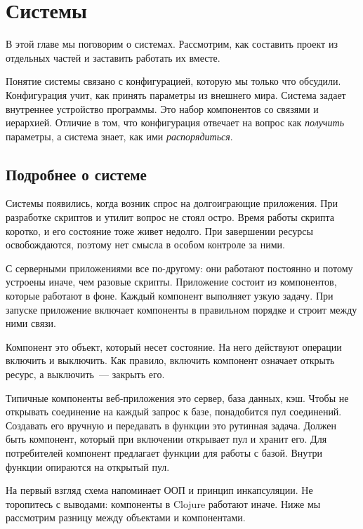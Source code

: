\chapter{Системы}

\label{chapter-systems}

\begin{teaser}
В этой главе мы поговорим о системах. Рассмотрим, как составить проект из
отдельных частей и заставить работать их вместе.
\end{teaser}

Понятие системы связано с конфигурацией, которую мы только что
обсудили. Конфигурация учит, как принять параметры из внешнего мира. Система
задает внутреннее устройство программы. Это набор компонентов со связями и
иерархией. Отличие в том, что конфигурация отвечает на вопрос как
\emph{получить} параметры, а система знает, как ими \emph{распорядиться}.

\section{Подробнее о системе}

Системы появились, когда возник спрос на долгоиграющие приложения. При
разработке скриптов и утилит вопрос не стоял остро. Время работы скрипта
коротко, и его состояние тоже живет недолго. При завершении ресурсы
освобождаются, поэтому нет смысла в особом контроле за ними.

С серверными приложениями все по-другому: они работают постоянно и потому
устроены иначе, чем разовые скрипты. Приложение состоит из компонентов, которые
работают в фоне. Каждый компонент выполняет узкую задачу. При запуске приложение
включает компоненты в правильном порядке и строит между ними связи.

Компонент это объект, который несет состояние. На него действуют операции
включить и выключить. Как правило, включить компонент означает открыть ресурс, а
выключить~--- закрыть его.

Типичные компоненты веб-приложения это сервер, база данных, кэш. Чтобы не
открывать соединение на каждый запрос к базе, понадобится пул
соединений. Создавать его вручную и передавать в функции это рутинная
задача. Должен быть компонент, который при включении открывает пул и хранит
его. Для потребителей компонент предлагает функции для работы с базой. Внутри
функции опираются на открытый пул.

На первый взгляд схема напоминает ООП и принцип инкапсуляции. Не торопитесь с
выводами: компоненты в Clojure работают иначе. Ниже мы рассмотрим разницу между
объектами и компонентами.

